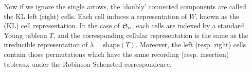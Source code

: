 Now if we ignore the single arrows, the `doubly' connected components are called the KL left (right) cells. Each cell induces a representation of $W$, known as the (KL) cell representation. In the case of $\mathfrak{S}_n$, each cells are indexed by a standard Young tableau $T$, and the corresponding cellular representation is the same as the irreducible representation of $\lambda=\text{shape}(T)$. Moreover, the left (resp. right) cells contain those permutations which have the same recording (resp. insertion) tableaux under the Robinson-Schensted correspondence.